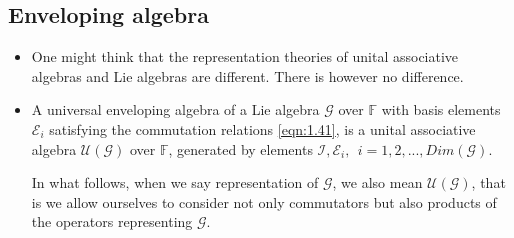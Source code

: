 \documentclass[11pt]{article}
\numberwithin{equation}{section}
\begin{document}
\subsection{Enveloping algebra}
\begin{itemize}
    \item One might think that the representation theories of unital associative algebras  and Lie algebras are different. There is however no difference. 
    \item A universal enveloping algebra of a Lie algebra $\mathcal{G}$ over $\mathbb{F}$ with basis elements $\mathcal{E}_i$ satisfying the commutation relations \ref{eqn:1.41}, is a unital associative algebra $\mathcal{U}(\mathcal{G})$ over $\mathbb{F}$, generated by elements $\mathcal{I},\mathcal{E}_i,~~ i = 1,2,...,Dim(\mathcal{G})$. 

In what follows, when we say representation of $\mathcal{G}$, we also mean $\mathcal{U}(\mathcal{G})$, that is we allow ourselves to consider not only commutators but also products of the operators representing $\mathcal{G}$.  



\end{itemize}
\end{document}
